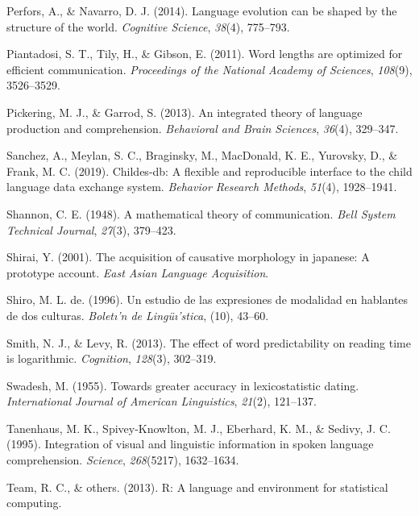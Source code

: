 \documentclass[man,floatsintext]{apa6}
\begin{document}
\leavevmode\hypertarget{ref-perfors2014language}{}%
Perfors, A., \& Navarro, D. J. (2014). Language evolution can be shaped by the structure of the world. \emph{Cognitive Science}, \emph{38}(4), 775--793.

\leavevmode\hypertarget{ref-piantadosi2011}{}%
Piantadosi, S. T., Tily, H., \& Gibson, E. (2011). Word lengths are optimized for efficient communication. \emph{Proceedings of the National Academy of Sciences}, \emph{108}(9), 3526--3529.

\leavevmode\hypertarget{ref-pickering2013}{}%
Pickering, M. J., \& Garrod, S. (2013). An integrated theory of language production and comprehension. \emph{Behavioral and Brain Sciences}, \emph{36}(4), 329--347.

\leavevmode\hypertarget{ref-sanchez2019}{}%
Sanchez, A., Meylan, S. C., Braginsky, M., MacDonald, K. E., Yurovsky, D., \& Frank, M. C. (2019). Childes-db: A flexible and reproducible interface to the child language data exchange system. \emph{Behavior Research Methods}, \emph{51}(4), 1928--1941.

\leavevmode\hypertarget{ref-shannon1948}{}%
Shannon, C. E. (1948). A mathematical theory of communication. \emph{Bell System Technical Journal}, \emph{27}(3), 379--423.

\leavevmode\hypertarget{ref-shirai2001}{}%
Shirai, Y. (2001). The acquisition of causative morphology in japanese: A prototype account. \emph{East Asian Language Acquisition}.

\leavevmode\hypertarget{ref-shiro1996}{}%
Shiro, M. L. de. (1996). Un estudio de las expresiones de modalidad en hablantes de dos culturas. \emph{Boletı'n de Lingüı'stica}, (10), 43--60.

\leavevmode\hypertarget{ref-smith2013}{}%
Smith, N. J., \& Levy, R. (2013). The effect of word predictability on reading time is logarithmic. \emph{Cognition}, \emph{128}(3), 302--319.

\leavevmode\hypertarget{ref-swadesh1955}{}%
Swadesh, M. (1955). Towards greater accuracy in lexicostatistic dating. \emph{International Journal of American Linguistics}, \emph{21}(2), 121--137.

\leavevmode\hypertarget{ref-tanenhaus1995}{}%
Tanenhaus, M. K., Spivey-Knowlton, M. J., Eberhard, K. M., \& Sedivy, J. C. (1995). Integration of visual and linguistic information in spoken language comprehension. \emph{Science}, \emph{268}(5217), 1632--1634.

\leavevmode\hypertarget{ref-team2013}{}%
Team, R. C., \& others. (2013). R: A language and environment for statistical computing.
\end{document}

